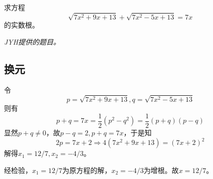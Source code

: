 

求方程
\[ \sqrt{7x^2 + 9x + 13} + \sqrt{7x^2 - 5x + 13} = 7x \]
的实数根。

\textit{JYH提供的题目。}


\subsection{换元}

令
\[ p = \sqrt{7x^2 + 9x + 13}, q = \sqrt{7x^2 - 5x + 13} \]
则有
\[ p + q = 7x = \frac12\left(p^2 - q^2\right) = \frac12(p + q)(p - q) \]
显然$p + q \ne 0$，故$p - q = 2, p + q = 7x$，于是知
\[ 2p = 7x + 2 \Rightarrow 4\left(7x^2 + 9x + 13\right) = (7x + 2)^2 \]
解得$x_1 = 12/7, x_2 = -4/3$。

经检验，$x_1 = 12/7$为原方程的解，$x_2 = -4/3$为增根。故$x = 12/7$。
